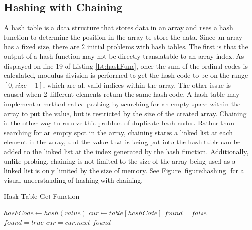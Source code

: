 \documentclass[letterpaper, 10pt,DIV=13]{scrartcl}
\numberwithin{equation}{section} %
\numberwithin{figure}{section} %
\numberwithin{table}{section} %
\begin{document}
\subsection{Hashing with Chaining}
A hash table is a data structure that stores data in an array and uses a hash function to determine the position in the array to store the data. Since an array has a fixed size, there are 2 initial problems with hash tables. The first is that the output of a hash function may not be directly translatable to an array index. As displayed on line 19 of Listing \ref{lst:hashFunc}, once the sum of the ordinal codes is calculated, modulus division is performed to get the hash code to be on the range $[0, size - 1]$, which are all valid indices within the array. The other issue is caused when 2 different elements return the same hash code. A hash table may implement a method called probing by searching for an empty space within the array to put the value, but is restricted by the size of the created array. Chaining is the other way to resolve this problem of duplicate hash codes. Rather than searching for an empty spot in the array, chaining stares a linked list at each element in the array, and the value that is being put into the hash table can be added to the linked list at the index generated by the hash function. Additionally, unlike probing, chaining is not limited to the size of the array being used as a linked list is only limited by the size of memory. See Figure \ref{figure:hashing} for a visual understanding of hashing with chaining.

\begin{algorithm}
  \caption{Hash Table Get Function}
  \label{algorithm:hashGet}
  \begin{algorithmic}[1]
        \State $hashCode \gets hash(value)$ 
        \State $cur \gets table[hashCode]$ 
        \State $found = false$ 
            \State $found = true$ 
          \EndIf
          \State $cur = cur.next$ 
        \EndWhile
        \State \Return $found$
      \EndProcedure
  \end{algorithmic}
\end{algorithm}
\end{document}
